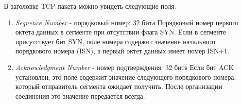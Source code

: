 \documentclass[a4paper, 14pt,russian]{article}
\begin{document}
		В заголовке TCP-пакета можно увидеть следующие поля:
		
		\begin{enumerate}
			\item \textit{Sequence Number} - порядковый номер: 32 бита
			Порядковый номер первого октета данных в сегменте при отсутствии флага SYN. Если в сегменте присутствует бит SYN, поле номера содержит значение начального порядкового номера (ISN), а первый октет данных имеет номер ISN+1.
			\item \textit{Acknowledgment Number} - номер подтверждения: 32 бита
			Если бит ACK установлен, это поле содержит значение следующего порядкового номера, который отправитель сегмента ожидает получить. После организации соединения это значение передается всегда.
		\end{enumerate}
	\newpage
	
\end{document}
